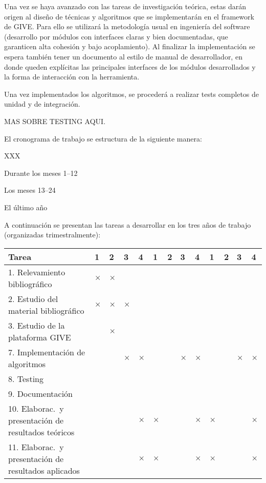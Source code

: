 Una vez se haya avanzado con las tareas de investigaci\'on te\'orica,
estas dar\'an origen al dise\~no de t\'ecnicas y algoritmos que se
implementar\'an en el framework de GIVE. Para ello se utilizar\'a la metodolog\'ia
usual en ingenier\'ia del software (desarrollo por
m\'odulos con interfaces claras y bien documentadas,
que garanticen alta cohesi\'on y bajo acoplamiento).
Al finalizar la implementaci\'on
se espera tambi\'en tener un documento al estilo de manual de
desarrollador, en donde queden expl\'icitas las principales interfaces
de los m\'odulos desarrollados y la forma de interacci\'on con la
herramienta.


Una vez
implementados los algoritmos, se proceder\'a a realizar tests
completos de unidad y de integraci\'on.

MAS SOBRE TESTING AQUI.


El cronograma de trabajo se estructura de la siguiente manera:

XXX

 Durante los meses 1--12


 Los meses 13--24

 El \'ultimo a\~no



A continuaci\'on se presentan las tareas a desarrollar en los tres a\~nos de trabajo (organizadas trimestralmente):

{\footnotesize
\begin{center}
\begin{tabular}{|p{7cm}||p{2mm}|p{2mm}|p{2mm}|p{2mm}||p{2mm}|p{2mm}|p{2mm}|p{2mm}||p{2mm}|p{2mm}|p{2mm}|p{2mm}||}
\hline
 \rowcolor[rgb]{0.8,0.8,0.8}\hspace{3.5cm}Tarea & 1 & 2 & 3 & 4 & 1 & 2 & 3 & 4 & 1 & 2 & 3 & 4\\
\hline 1. Relevamiento bibliogr\'afico
& $\times$ & $\times$ &&&&&&&&&&\\
\hline 2. Estudio del material bibliogr\'afico
& $\times$ & $\times$ & $\times$ &  &&&&&&&&\\
\hline 3. Estudio de la plataforma GIVE
& & $\times$ & &&&&&&&&&\\
\hline 7. Implementaci\'on de algoritmos
& & & $\times$ & $\times$&&&$\times$&$\times$&&&$\times$&$\times$\\
\hline 8. Testing
&&&&&&&&&&&&\\
\hline 9. Documentaci\'on
&&&&&&&&&&&&\\
\hline 10. Elaborac.\ y presentaci\'on de resultados te\'oricos
&&&&$\times$&$\times$&&&$\times$&$\times$&&&$\times$\\
\hline 11. Elaborac.\ y presentaci\'on de resultados aplicados
&&&&$\times$&$\times$&&&$\times$&$\times$&&&$\times$\\\hline
\end{tabular}\end{center}
}

